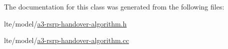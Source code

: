 The documentation for this class was generated from the following files\+:\begin{DoxyCompactItemize}
\item 
lte/model/\hyperlink{a3-rsrp-handover-algorithm_8h}{a3-\/rsrp-\/handover-\/algorithm.\+h}\item 
lte/model/\hyperlink{a3-rsrp-handover-algorithm_8cc}{a3-\/rsrp-\/handover-\/algorithm.\+cc}\end{DoxyCompactItemize}
